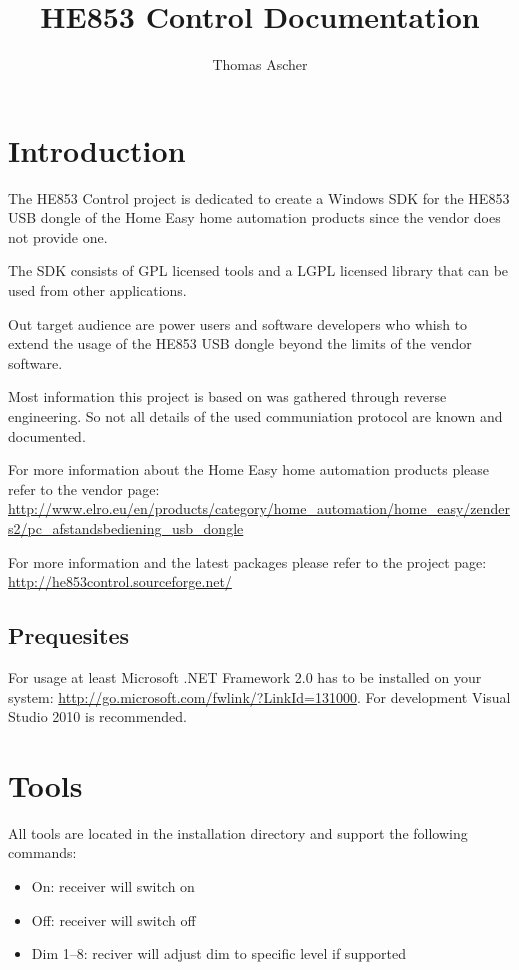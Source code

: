 \documentclass[
a4paper,
oneside,
halfparskip*,
normalheadings,
]
{scrbook}
\begin{document}
\title{HE853 Control Documentation}
\author{Thomas Ascher}
\maketitle
\tableofcontents
\mainmatter

\chapter{Introduction}

The HE853 Control project is dedicated to create a Windows SDK for the HE853 USB
dongle of the Home Easy home automation products since the vendor does not provide
one.

The SDK consists of GPL licensed tools and a LGPL licensed library that can be
used from other applications.

Out target audience are power users and software developers who whish to extend the
usage of the HE853 USB dongle beyond the limits of the vendor software.

Most information this project is based on was gathered through reverse engineering.
So not all details of the used communiation protocol are known and documented.

For more information about the Home Easy home automation products please refer to
the vendor page: \url{http://www.elro.eu/en/products/category/home_automation/home_easy/zenders2/pc_afstandsbediening_usb_dongle}

For more information and the latest packages please refer to the project page:
\url{http://he853control.sourceforge.net/}

\section{Prequesites}
For usage at least Microsoft .NET Framework 2.0 has to be installed on your
system: \url{http://go.microsoft.com/fwlink/?LinkId=131000}. For development
Visual Studio 2010 is recommended.




\chapter{Tools}

All tools are located in the installation directory and support the following commands:

\begin{itemize}
	\item On: receiver will switch on
	\item Off: receiver will switch off
	\item Dim 1--8: reciver will adjust dim to specific level if supported
\end{itemize}
\end{document}
